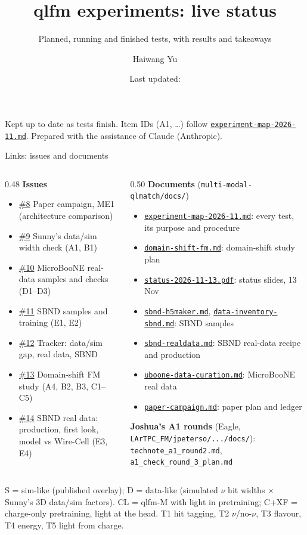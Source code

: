 \documentclass[aspectratio=169,10pt]{beamer}
\title{qlfm experiments: live status}
\subtitle{Planned, running and finished tests, with results and takeaways}
\author{Haiwang Yu}
\institute{fm4npp-lartpc \;\textbullet\; issues \iss{8}--\iss{14}}
\date{Last updated: \updated}
\newcommand{\gh}{https://github.com/HaiwangYu/fm4npp-lartpc}
\newcommand{\iss}[1]{\href{\gh/issues/#1}{\color{blue!60!black}\##1}}
\newcommand{\doc}[1]{\href{\gh/blob/main/multi-modal-qlmatch/docs/#1}{\color{blue!60!black}\texttt{#1}}}
\begin{document}
\begin{frame}
  \titlepage
  \vfill
  {\tiny Kept up to date as tests finish. Item IDs (A1, \dots) follow \doc{experiment-map-2026-11.md}.
  Prepared with the assistance of Claude (Anthropic).}
\end{frame}

\begin{frame}{Links: issues and documents}
  \footnotesize
  \begin{columns}[T]
    \begin{column}{0.48\textwidth}
      \textbf{Issues}
      \begin{itemize}
        \item \iss{8} Paper campaign, ME1 (architecture comparison)
        \item \iss{9} Sunny's data/sim width check (A1, B1)
        \item \iss{10} MicroBooNE real-data samples and checks (D1--D3)
        \item \iss{11} SBND samples and training (E1, E2)
        \item \iss{12} Tracker: data/sim gap, real data, SBND
        \item \iss{13} Domain-shift FM study (A4, B2, B3, C1--C5)
        \item \iss{14} SBND real data: production, first look, model vs Wire-Cell (E3, E4)
      \end{itemize}
    \end{column}
    \begin{column}{0.50\textwidth}
      \textbf{Documents} (\texttt{multi-modal-qlmatch/docs/})
      \begin{itemize}
        \item \doc{experiment-map-2026-11.md}: every test, its purpose and procedure
        \item \doc{domain-shift-fm.md}: domain-shift study plan
        \item \doc{status-2026-11-13.pdf}: status slides, 13 Nov
        \item \doc{sbnd-h5maker.md}, \doc{data-inventory-sbnd.md}: SBND samples
        \item \doc{sbnd-realdata.md}: SBND real-data recipe and production
        \item \doc{uboone-data-curation.md}: MicroBooNE real data
        \item \doc{paper-campaign.md}: paper plan and ledger
      \end{itemize}
      \textbf{Joshua's A1 rounds} (Eagle, \texttt{LArTPC\_FM/jpeterso/.../docs/}):
      \texttt{technote\_a1\_round2.md}, \texttt{a1\_check\_round\_3\_plan.md}
    \end{column}
  \end{columns}
  \vspace{4pt}
  {\scriptsize S = sim-like (published overlay); D = data-like (simulated $\nu$ hit widths $\times$ Sunny's 3D data/sim factors).
  CL = qlfm-M with light in pretraining; C+XF = charge-only pretraining, light at the head.
  T1 hit tagging, T2 $\nu$/no-$\nu$, T3 flavour, T4 energy, T5 light from charge.}
\end{frame}
\end{document}

